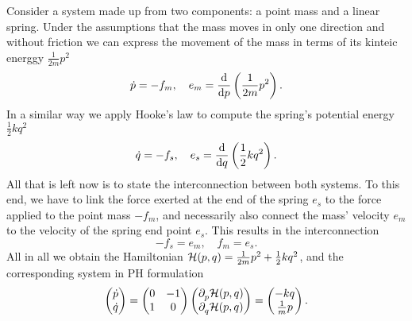 \begin{example}\label{ex:ms-system}
    Consider a system made up from two components: a point mass and a linear spring.
    Under the assumptions that the mass moves in only one direction and without friction we can express the movement of the mass in terms of its kinteic energgy $\frac{1}{2m} p^2$
    \begin{equation*}
        \dot{p} = -f_m,\quad e_m = \frac{\dif}{\dif p} \left( \frac{1}{2m} p^2 \right).
    \end{equation*}
    In a similar way we apply Hooke's law to compute the spring's potential energy $\frac{1}{2} k q^2$
    \begin{equation*}
        \dot{q} = -f_s,\quad e_s = \frac{\dif}{\dif q} \left( \frac{1}{2} k q^2 \right).
    \end{equation*}
    All that is left now is to state the interconnection between both systems.
    To this end, we have to link the force exerted at the end of the spring $e_s$ to the force applied to the point mass $-f_m$, and necessarily also connect the mass' velocity $e_m$ to the velocity of the spring end point $e_s$.
    This results in the interconnection
    \begin{equation*}
        -f_s = e_m,\quad f_m = e_s.
    \end{equation*}
    All in all we obtain the Hamiltonian $\mcl{H}(p, q) = \frac{1}{2m} p^2 + \frac{1}{2} k q^2$, and the corresponding system in \ac{PH} formulation
    \begin{equation*}
        \begin{pmatrix}
            \dot{p} \\
            \dot{q}
        \end{pmatrix} =
        \begin{pmatrix}
            0 & -1 \\
            1 & 0
        \end{pmatrix}
        \begin{pmatrix}
            \pd[p]{} \mcl{H}(p, q) \\
            \pd[q]{} \mcl{H}(p, q)
        \end{pmatrix} =
        \begin{pmatrix}
            -k q \\
            \frac{1}{m} p
        \end{pmatrix}.
    \end{equation*}

\end{example}

